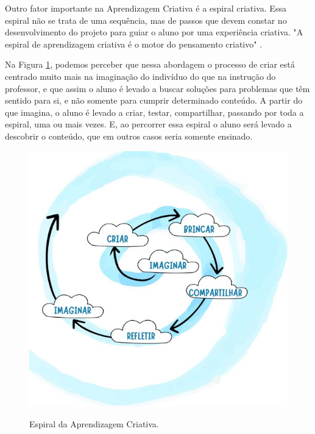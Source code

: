 \documentclass[portuguese]{textolivre}
\begin{document}
Outro fator importante na Aprendizagem Criativa é a espiral criativa. Essa espiral não se trata de uma sequência, mas de passos que devem constar no desenvolvimento do projeto para guiar o aluno por uma experiência criativa. "A espiral de aprendizagem criativa é o motor do pensamento criativo" \cite [p. 12] {resnick}.

Na Figura \ref{figA}, podemos perceber que nessa abordagem o processo de criar está centrado muito mais na imaginação do indivíduo do que na instrução do professor, e que assim o aluno é levado a buscar soluções para problemas que têm sentido para si, e não somente para cumprir determinado conteúdo. A partir do que imagina, o aluno é levado a criar, testar, compartilhar, passando por toda a espiral, uma ou mais vezes. E, ao percorrer essa espiral o aluno será levado a descobrir o conteúdo, que em outros casos seria somente ensinado.

\begin{figure}[htbp]
\centering
\begin{minipage}{.5\textwidth}
 \includegraphics[width=\textwidth]{Figuras/figura01}
 \caption{Espiral da Aprendizagem Criativa.}
  \label{figA}
\end{minipage}
\end{figure}
\end{document}
